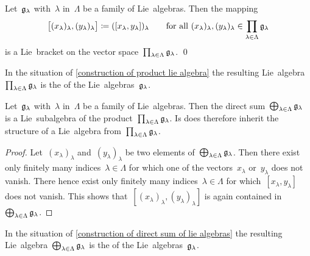 \begin{proposition}
  \label{construction of product lie algebra}
  Let~$\mathfrak{g}_{\lambda}$ with~$\lambda$ in~$\Lambda$ be a family of Lie~algebras.
  Then the mapping
  \[
    \bigl[ (x_\lambda)_\lambda, (y_\lambda)_\lambda \bigr]
    \coloneqq
    ( [x_\lambda, y_\lambda] )_\lambda
    \qquad
    \text{for all~$(x_\lambda)_\lambda, (y_\lambda)_\lambda \in \prod_{\lambda \in \Lambda} \mathfrak{g}_\lambda$}
  \]
  is a Lie~bracket on the vector space~$\prod_{\lambda \in \Lambda} \mathfrak{g}_\lambda$.
  \qed
\end{proposition}


\begin{definition}
  In the situation of \cref{construction of product lie algebra} the resulting Lie~algebra~$\prod_{\lambda \in \Lambda} \mathfrak{g}_\lambda$ is the  of the Lie~algebras~$\mathfrak{g}_\lambda$.
\end{definition}


\begin{proposition}
  \label{construction of direct sum of lie algebras}
  Let~$\mathfrak{g}_\lambda$ with~$\lambda$ in~$\Lambda$ be a family of Lie~algebras.
  Then the direct sum~$\bigoplus_{\lambda \in \Lambda} \mathfrak{g}_\lambda$ is a Lie~subalgebra of the product~$\prod_{\lambda \in \Lambda} \mathfrak{g}_\lambda$.
  Is does therefore inherit the structure of a Lie~algebra from~$\prod_{\lambda \in \Lambda} \mathfrak{g}_\lambda$.
\end{proposition}


\begin{proof}
  Let~$(x_\lambda)_\lambda$ and~$(y_\lambda)_\lambda$ be two elements of~$\bigoplus_{\lambda \in \Lambda} \mathfrak{g}_\lambda$.
  Then there exist only finitely many indices~$\lambda \in \Lambda$ for which one of the vectors~$x_\lambda$ or~$y_\lambda$ does not vanish.
  There hence exist only finitely many indices~$\lambda \in \Lambda$ for which~$[x_\lambda, y_\lambda]$ does not vanish.
  This shows that~$[ (x_\lambda)_\lambda, (y_\lambda)_\lambda ]$ is again contained in~$\bigoplus_{\lambda \in \Lambda} \mathfrak{g}_\lambda$.
\end{proof}


\begin{definition}
  In the situation of \cref{construction of direct sum of lie algebras} the resulting Lie~algebra~$\bigoplus_{\lambda \in \Lambda} \mathfrak{g}_\lambda$ is the  of the Lie~algebras~$\mathfrak{g}_\lambda$.
\end{definition}


